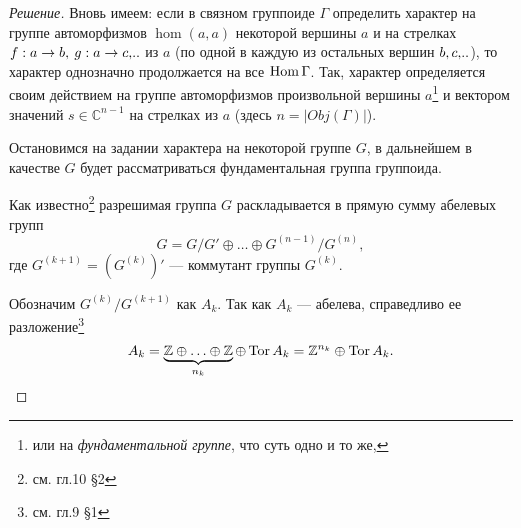 \begin{proof}[Решение]
    Вновь имеем: если в связном группоиде $\Gamma$ определить характер на 
    группе автоморфизмов $\hom(a,a)$ некоторой вершины $a$ и на стрелках $f: a \to b,\: 
    g: a \to c,\!..$ из $a$ (по одной в каждую из остальных вершин $b,c,\!..$), то 
    характер однозначно продолжается на все $\operatorname*{Hom} \Gamma$. Так, характер 
    определяется своим  действием на группе автоморфизмов произвольной
    вершины $a$\footnote{или на \emph{фундаментальной группе}, что суть 
    одно и то же,} и вектором значений $s \in \mathbb{C}^{n-1}$ на стрелках из 
    $a$ (здесь $n = |Obj(\Gamma)|$).

    Остановимся на задании характера на некоторой группе $G$, в дальнейшем в 
    качестве $G$ будет рассматриваться фундаментальная группа группоида.

    Как известно\footnote{см. \cite{Vinberg} гл.10 \S 2} разрешимая 
    группа $G$ раскладывается в прямую сумму абелевых групп 
    \[G = G/G' \oplus \ldots \oplus G^{(n-1)}/G^{(n)},\]
    где $G^{(k+1)} = (G^{(k)})'$ --- коммутант группы $G^{(k)}$.

    Обозначим $G^{(k)} / G^{(k+1)}$ как $A_k$. Так как $A_k$ --- абелева, 
    справедливо ее разложение\footnote{см.\cite{Vinberg} гл.9 \S 1}
    \[A_k = \underbrace{\mathbb{Z} \oplus \ldots \oplus \mathbb{Z}}_{n_k} 
    \oplus \operatorname*{Tor} A_k = \mathbb{Z}^{n_k} \oplus \operatorname*{Tor} A_k.\]




\end{proof}